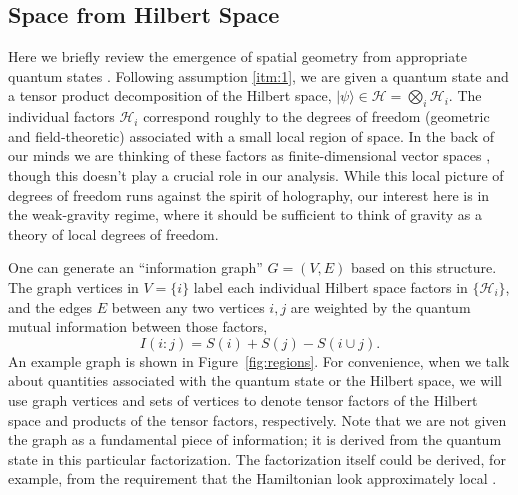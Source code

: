 \documentclass[%
12pt,preprint,
nofootinbib,
amsmath,amssymb,
aps,
prd,
showpacs,
superscriptaddress
]{revtex4-2}
\DeclareMathOperator{\co}{:}
\begin{document}
\subsection{Space from Hilbert Space}\label{sec:briefreview}

Here we briefly review the emergence of spatial geometry from appropriate quantum states \cite{Cao:2016mst}.
Following assumption \ref{itm:1}, we are given a quantum state and a tensor product decomposition of the Hilbert space, $|\psi\rangle\in\mathcal{H}=\bigotimes_i\mathcal{H}_i$. 
The individual factors $\mathcal{H}_i$ correspond roughly to the degrees of freedom (geometric and field-theoretic) associated with a small local region of space.
In the back of our minds we are thinking of these factors as finite-dimensional vector spaces \cite{Bao:2017rnv}, though this doesn't play a crucial role in our analysis.
While this local picture of degrees of freedom runs against the spirit of holography, our interest here is in the weak-gravity regime, where it should be sufficient to think of gravity as a theory of local degrees of freedom.

One can generate an ``information graph'' $G=(V,E)$ based on this structure. The graph vertices in $V=\{i\}$ label each individual Hilbert space factors in $\{\mathcal{H}_i\}$, and the edges $E$ between any two vertices $i,j$ are weighted by the quantum mutual information between those factors,
\begin{equation}
  I(i\co j)=S(i)+S(j)-S(i\cup j).
\end{equation}
An example graph is shown in  Figure~\ref{fig:regions}.
For convenience, when we talk about quantities associated with the quantum state or the Hilbert space, we will use graph vertices and sets of vertices to denote tensor factors of the Hilbert space and products of the tensor factors, respectively. 
Note that we are not given the graph as a fundamental piece of information; it is derived from the quantum state in this particular factorization.
The factorization itself could be derived, for example, from the requirement that the Hamiltonian look approximately local \cite{Cotler:2017abq}.
\end{document}
